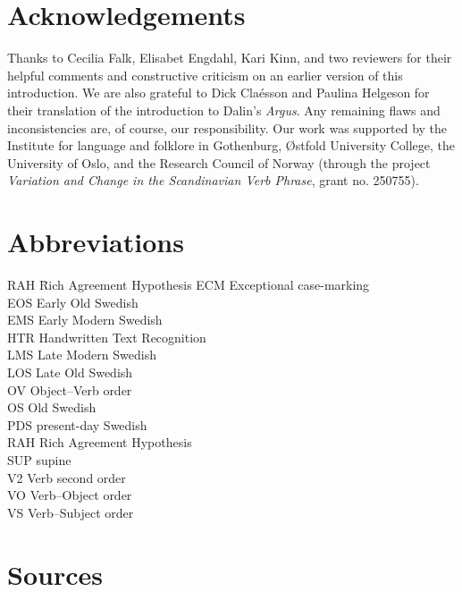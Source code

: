 \documentclass[output=paper]{langscibook}
\begin{document}
\section*{Acknowledgements}


Thanks to Cecilia Falk, Elisabet Engdahl, Kari Kinn, and two reviewers for their helpful comments and constructive criticism on an earlier version of this introduction. We are also grateful to Dick Claésson and Paulina Helgeson for their translation of the introduction to Dalin’s \textit{Argus}. Any remaining flaws and inconsistencies are, of course, our responsibility. Our work was supported by the Institute for language and folklore in Gothenburg, Østfold University College, the University of Oslo, and the Research Council of Norway (through the project \textit{Variation and Change in the Scandinavian Verb Phrase}, grant no. 250755).

\section*{Abbreviations}

\begin{multicols}{2}
\begin{tabbing}
RAH\hspace{1ex} \= Rich Agreement Hypothesis\kill
ECM \>  Exceptional case-marking    \\
EOS \>  Early Old Swedish\\
EMS \>  Early Modern Swedish\\
HTR \>  Handwritten Text Recognition\\
LMS \> Late Modern Swedish\\
LOS \>  Late Old Swedish\\
OV  \> Object–Verb order \\
OS  \> Old Swedish\\
PDS \>  present-day Swedish\\
RAH \>  Rich Agreement Hypothesis\\
SUP \>  supine\\
V2  \> Verb second order\\
VO  \> Verb–Object order\\
VS  \> Verb–Subject order
\end{tabbing}
\end{multicols}

\section*{Sources}
\end{document}
